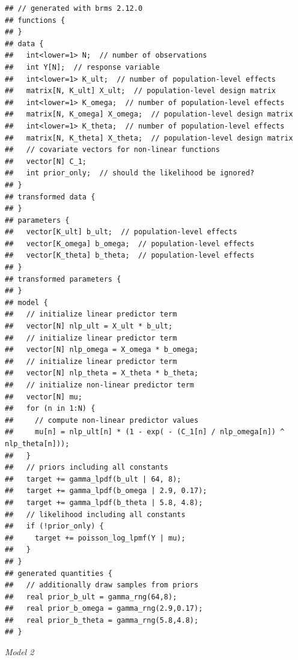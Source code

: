 \documentclass[
]{article}
\begin{document}
\begin{verbatim}
## // generated with brms 2.12.0
## functions {
## }
## data {
##   int<lower=1> N;  // number of observations
##   int Y[N];  // response variable
##   int<lower=1> K_ult;  // number of population-level effects
##   matrix[N, K_ult] X_ult;  // population-level design matrix
##   int<lower=1> K_omega;  // number of population-level effects
##   matrix[N, K_omega] X_omega;  // population-level design matrix
##   int<lower=1> K_theta;  // number of population-level effects
##   matrix[N, K_theta] X_theta;  // population-level design matrix
##   // covariate vectors for non-linear functions
##   vector[N] C_1;
##   int prior_only;  // should the likelihood be ignored?
## }
## transformed data {
## }
## parameters {
##   vector[K_ult] b_ult;  // population-level effects
##   vector[K_omega] b_omega;  // population-level effects
##   vector[K_theta] b_theta;  // population-level effects
## }
## transformed parameters {
## }
## model {
##   // initialize linear predictor term
##   vector[N] nlp_ult = X_ult * b_ult;
##   // initialize linear predictor term
##   vector[N] nlp_omega = X_omega * b_omega;
##   // initialize linear predictor term
##   vector[N] nlp_theta = X_theta * b_theta;
##   // initialize non-linear predictor term
##   vector[N] mu;
##   for (n in 1:N) {
##     // compute non-linear predictor values
##     mu[n] = nlp_ult[n] * (1 - exp( - (C_1[n] / nlp_omega[n]) ^ nlp_theta[n]));
##   }
##   // priors including all constants
##   target += gamma_lpdf(b_ult | 64, 8);
##   target += gamma_lpdf(b_omega | 2.9, 0.17);
##   target += gamma_lpdf(b_theta | 5.8, 4.8);
##   // likelihood including all constants
##   if (!prior_only) {
##     target += poisson_log_lpmf(Y | mu);
##   }
## }
## generated quantities {
##   // additionally draw samples from priors
##   real prior_b_ult = gamma_rng(64,8);
##   real prior_b_omega = gamma_rng(2.9,0.17);
##   real prior_b_theta = gamma_rng(5.8,4.8);
## }
\end{verbatim}

\emph{Model 2}
\end{document}
